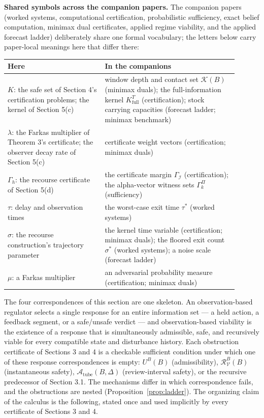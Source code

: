 \documentclass[10pt,twocolumn]{article}
\theoremstyle{definition}
\begin{document}
\medskip
\noindent\textbf{Shared symbols across the companion papers.} The
companion papers (worked systems, computational certification,
probabilistic sufficiency, exact belief computation, minimax dual
certificates, applied regime viability, and the applied forecast ladder)
deliberately share one formal vocabulary; the letters below carry
paper-local meanings here that differ there:
\begin{center}\small
\begin{tabular}{@{}p{0.38\linewidth}p{0.52\linewidth}@{}}
\toprule
\textbf{Here} & \textbf{In the companions} \\
\midrule
\(K\): the safe set of Section 4's certification problems; the kernel of Section 5(c) & window depth and contact set \(\mathcal{K}(B)\) (minimax duals); the full-information kernel \(K^{T}_{\mathrm{full}}\) (certification); stock carrying capacities (forecast ladder; minimax benchmark) \\
\(\lambda\): the Farkas multiplier of Theorem 3's certificate; the observer decay rate of Section 5(c) & certificate weight vectors (certification; minimax duals) \\
\(\Gamma_{h}\): the recourse certificate of Section 5(d) & the certificate margin \(\Gamma_{\mathcal{I}}\) (certification); the alpha-vector witness sets \(\Gamma^{\Pi}_{k}\) (sufficiency) \\
\(\tau\): delay and observation times & the worst-case exit time \(\tau^{*}\) (worked systems) \\
\(\sigma\): the recourse construction's trajectory parameter & the kernel time variable (certification; minimax duals); the floored exit count \(\sigma^{*}\) (worked systems); a noise scale (forecast ladder) \\
\(\mu\): a Farkas multiplier & an adversarial probability measure (certification; minimax duals) \\
\bottomrule
\end{tabular}
\end{center}


The four correspondences of this section are one skeleton. An
observation-based regulator selects a single response for an entire
information set --- a held action, a feedback segment, or a
safe/unsafe verdict --- and observation-based viability is the existence
of a response that is simultaneously admissible, safe, and recursively
viable for every compatible state and disturbance history. Each
obstruction certificate of Sections 3 and 4 is a checkable sufficient
condition under which one of these response correspondences is empty:
\(U^B(B)\) (admissibility), \(\mathcal{R}_{\mathcal{V}}^B(B)\)
(instantaneous safety), \(\mathcal{A}_{\mathrm{tube}}(B,\Delta)\)
(review-interval safety), or the recursive predecessor of Section 3.1.
The mechanisms differ in which correspondence fails, and the
obstructions are nested (Proposition~\ref{prop:ladder}). The organizing
claim of the calculus is the following, stated once and used implicitly
by every certificate of Sections 3 and 4.
\end{document}
